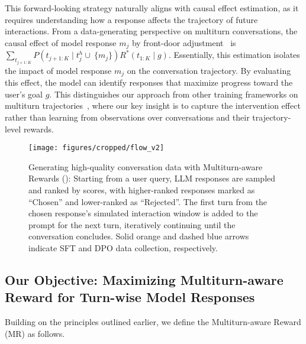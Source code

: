 This forward-looking strategy naturally aligns with causal effect estimation, as it requires understanding how a response affects the trajectory of future interactions. From a data-generating perspective on multiturn conversations, the causal effect of model response $m_j$  by front-door adjustment~\citep{Pearl09a, pearl2016causal} is 
$ \sum_{t_{j+1:K}} P(t_{j+1:K} \mid t_j^h\cup\ \{m_j\}) R^*(t_{1:K} \mid g)$. 
Essentially, this estimation isolates the impact of model response $m_j$ on the conversation trajectory. By evaluating this effect, the model can identify responses that maximize progress toward the user’s goal $g$. This distinguishes our approach from other training frameworks on multiturn trajectories~\citep{multiturn_rlhf, archer, refuel}, where our key insight is to capture the intervention effect rather than learning from observations over conversations and their trajectory-level rewards.

\begin{figure*}[t]
    \centering
    \texttt{[image: figures/cropped/flow\_v2]}
    \vspace{-20pt}
    \caption{Generating high-quality conversation data with Multiturn-aware Rewards (\ourst): Starting from a user query, LLM responses are sampled and ranked by \ours scores, with higher-ranked responses marked as ``Chosen'' and lower-ranked as ``Rejected''. The first turn from the chosen response's simulated interaction window is added to the prompt for the next turn, iteratively continuing until the conversation concludes. Solid orange and dashed blue arrows indicate SFT and DPO data collection, respectively.}
    \label{fig:flow}
\end{figure*}
\subsection{Our Objective: Maximizing Multiturn-aware Reward for Turn-wise Model Responses}
\label{sec:reward} 

Building on the principles outlined earlier, we define the Multiturn-aware Reward (MR) as follows.

